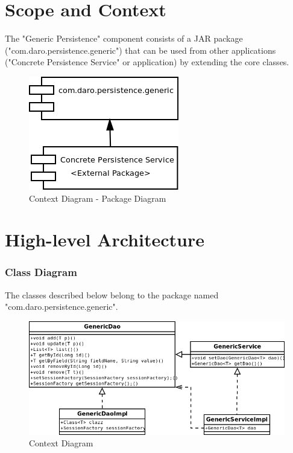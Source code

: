 \documentclass[a4paper,11pt]{book}
\begin{document}
\section{Scope and Context}
The "Generic Persistence" component consists of a JAR package ("com.daro.persistence.generic") that can be used from other applications ("Concrete Persistence Service" or application) by extending the core classes.

\begin{figure}[h] %
  \includegraphics{generic_persistence_package_diagram}
  \caption{Context Diagram - Package Diagram}
  \centering
  \label{fig:context} %
\end{figure}

\section{High-level Architecture}

\pagebreak
\subsubsection{Class Diagram}
The classes described below belong to the package named "com.daro.persistence.generic".

\begin{figure}[h] %
  \includegraphics[width=\textwidth]{generic_persistence_class_diagram}
  \caption{Context Diagram}
  \centering
  \label{fig:generic_persistence_class_diagram} %
\end{figure}
\end{document}
